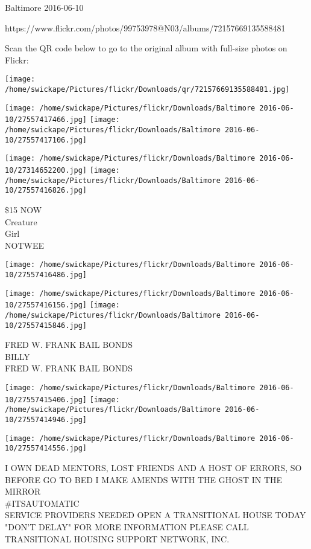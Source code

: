 \documentclass[10pt,letterpaper]{article}
\begin{document}
Baltimore 2016-06-10

https://www.flickr.com/photos/99753978@N03/albums/72157669135588481

Scan the QR code below to go to the original album with full-size photos on Flickr:

\texttt{[image: /home/swickape/Pictures/flickr/Downloads/qr/72157669135588481.jpg]}
\pagebreak

\texttt{[image: /home/swickape/Pictures/flickr/Downloads/Baltimore 2016-06-10/27557417466.jpg]}
\texttt{[image: /home/swickape/Pictures/flickr/Downloads/Baltimore 2016-06-10/27557417106.jpg]}

\texttt{[image: /home/swickape/Pictures/flickr/Downloads/Baltimore 2016-06-10/27314652200.jpg]}
\texttt{[image: /home/swickape/Pictures/flickr/Downloads/Baltimore 2016-06-10/27557416826.jpg]}

\$15 NOW\\
Creature\\
Girl\\
NOTWEE\\
\pagebreak

\texttt{[image: /home/swickape/Pictures/flickr/Downloads/Baltimore 2016-06-10/27557416486.jpg]}

\vspace{0.25in}
\texttt{[image: /home/swickape/Pictures/flickr/Downloads/Baltimore 2016-06-10/27557416156.jpg]}
\texttt{[image: /home/swickape/Pictures/flickr/Downloads/Baltimore 2016-06-10/27557415846.jpg]}

FRED W. FRANK BAIL BONDS\\
BILLY\\
FRED W. FRANK BAIL BONDS\\
\pagebreak

\texttt{[image: /home/swickape/Pictures/flickr/Downloads/Baltimore 2016-06-10/27557415406.jpg]}
\texttt{[image: /home/swickape/Pictures/flickr/Downloads/Baltimore 2016-06-10/27557414946.jpg]}

\vspace{0.25in}
\texttt{[image: /home/swickape/Pictures/flickr/Downloads/Baltimore 2016-06-10/27557414556.jpg]}

I OWN DEAD MENTORS, LOST FRIENDS AND A HOST OF ERRORS, SO BEFORE GO TO BED I MAKE AMENDS WITH THE GHOST IN THE MIRROR\\
\#ITSAUTOMATIC\\
SERVICE PROVIDERS NEEDED OPEN A TRANSITIONAL HOUSE TODAY "DON'T DELAY" FOR MORE INFORMATION PLEASE CALL TRANSITIONAL HOUSING SUPPORT NETWORK, INC.\\
\pagebreak
\end{document}
